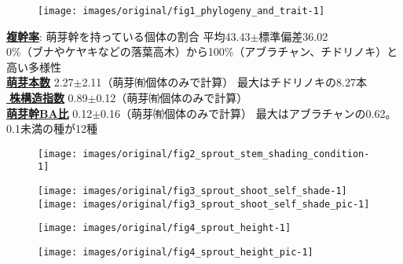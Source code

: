 \documentclass[a0, 30pt, plainboxedsections]{sciposter} %
\begin{document}
\begin{multicols}{2}

\begin{mdframed}[style=subsection.frame,frametitle={\textbf{\huge{\ding{192}}\LARGE{25種の株構造は種間で大きく異なる}}}]

\begin{figure}
  \centering
    \texttt{[image: images/original/fig1\_phylogeny\_and\_trait-1]}
\end{figure}

\textbf{\underline{複幹率}}{\footnotesize: 萌芽幹を持っている個体の割合} 平均43.43$\pm$標準偏差36.02\\
{\scriptsize 0\%（ブナやケヤキなどの落葉高木）から100\%（アブラチャン、チドリノキ）と高い多様性}\\
\textbf{\underline{萌芽本数}} 2.27$\pm$2.11{\footnotesize（萌芽㈲個体のみで計算）}
{\scriptsize 最大はチドリノキの8.27本}\\
\textbf{\underline{株構造指数}} 0.89$\pm$0.12{\footnotesize（萌芽㈲個体のみで計算）}\\
\textbf{\underline{萌芽幹BA比}} 0.12$\pm$0.16{\footnotesize（萌芽㈲個体のみで計算）}
{\scriptsize 最大はアブラチャンの0.62。0.1未満の種が12種}


\end{mdframed}

\begin{mdframed}[style=subsection.frame,frametitle=\textbf{\huge{\ding{194}}\LARGE{萌芽性が強い種ほど自己被陰率が下がる}}]

\begin{figure}
 \begin{minipage}{0.25\hsize}
  \centering
   \texttt{[image: images/original/fig2\_sprout\_stem\_shading\_condition-1]}
 \end{minipage}
 \begin{minipage}{0.75\hsize}
  \centering
   \texttt{[image: images/original/fig3\_sprout\_shoot\_self\_shade-1]}
   \texttt{[image: images/original/fig3\_sprout\_shoot\_self\_shade\_pic-1]}
 \end{minipage}
\end{figure}

\end{mdframed}

\columnbreak
\begin{mdframed}[style=subsection.frame,frametitle=\textbf{\huge{\ding{193}}\LARGE{萌芽性が強くなるほど樹高が低くなる}}]

\begin{figure}
	\centering
		\texttt{[image: images/original/fig4\_sprout\_height-1]}
\end{figure}

\begin{figure}
	\centering
		\texttt{[image: images/original/fig4\_sprout\_height\_pic-1]}
\end{figure}

\end{mdframed}

\end{multicols}

\end{document}
